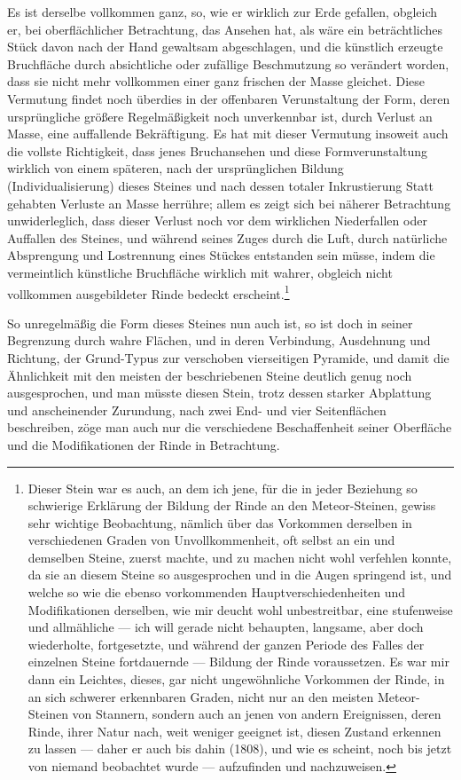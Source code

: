 \documentclass[a4paper, 11pt, oneside, german]{article}
\begin{document}
Es ist derselbe vollkommen ganz, so, wie er wirklich zur Erde gefallen, obgleich er, bei oberflächlicher Betrachtung, das Ansehen hat, als wäre ein beträchtliches Stück davon nach der Hand gewaltsam abgeschlagen, und die künstlich erzeugte Bruchfläche durch absichtliche oder zufällige Beschmutzung so verändert worden, dass sie nicht mehr vollkommen einer ganz frischen der Masse gleichet. Diese Vermutung findet noch überdies in der offenbaren Verunstaltung der Form, deren ursprüngliche größere Regelmäßigkeit noch unverkennbar ist, durch Verlust an Masse, eine auffallende Bekräftigung. Es hat mit dieser Vermutung insoweit auch die vollste Richtigkeit, dass jenes Bruchansehen und diese Formverunstaltung wirklich von einem späteren, nach der ursprünglichen Bildung (Individualisierung) dieses Steines und nach dessen totaler Inkrustierung Statt gehabten Verluste an Masse herrühre; allem es zeigt sich bei näherer Betrachtung unwiderleglich, dass dieser Verlust noch vor dem wirklichen Niederfallen oder Auffallen des Steines, und während seines Zuges durch die Luft, durch natürliche Absprengung und Lostrennung eines Stückes entstanden sein müsse, indem die vermeintlich künstliche Bruchfläche wirklich mit wahrer, obgleich nicht vollkommen ausgebildeter Rinde bedeckt erscheint.\footnote{Dieser Stein war es auch, an dem ich jene, für die in jeder Beziehung so schwierige Erklärung der Bildung der Rinde an den Meteor-Steinen, gewiss sehr wichtige Beobachtung, nämlich über das Vorkommen derselben in verschiedenen Graden von Unvollkommenheit, oft selbst an ein und demselben Steine, zuerst machte, und zu machen nicht wohl verfehlen konnte, da sie an diesem Steine so ausgesprochen und in die Augen springend ist, und welche so wie die ebenso vorkommenden Hauptverschiedenheiten und Modifikationen derselben, wie mir deucht wohl unbestreitbar, eine stufenweise und allmähliche --- ich will gerade nicht behaupten, langsame, aber doch wiederholte, fortgesetzte, und während der ganzen Periode des Falles der einzelnen Steine fortdauernde --- Bildung der Rinde voraussetzen. Es war mir dann ein Leichtes, dieses, gar nicht ungewöhnliche Vorkommen der Rinde, in an sich schwerer erkennbaren Graden, nicht nur an den meisten Meteor-Steinen von Stannern, sondern auch an jenen von andern Ereignissen, deren Rinde, ihrer Natur nach, weit weniger geeignet ist, diesen Zustand erkennen zu lassen --- daher er auch bis dahin (1808), und wie es scheint, noch bis jetzt von niemand beobachtet wurde --- aufzufinden und nachzuweisen.}

So unregelmäßig die Form dieses Steines nun auch ist, so ist doch in seiner Begrenzung durch wahre Flächen, und in deren Verbindung, Ausdehnung und Richtung, der Grund-Typus zur verschoben vierseitigen Pyramide, und damit die Ähnlichkeit mit den meisten der beschriebenen Steine deutlich genug noch ausgesprochen, und man müsste diesen Stein, trotz dessen starker Abplattung und anscheinender Zurundung, nach zwei End- und vier Seitenflächen beschreiben, zöge man auch nur die verschiedene Beschaffenheit seiner Oberfläche und die Modifikationen der Rinde in Betrachtung.
\end{document}
